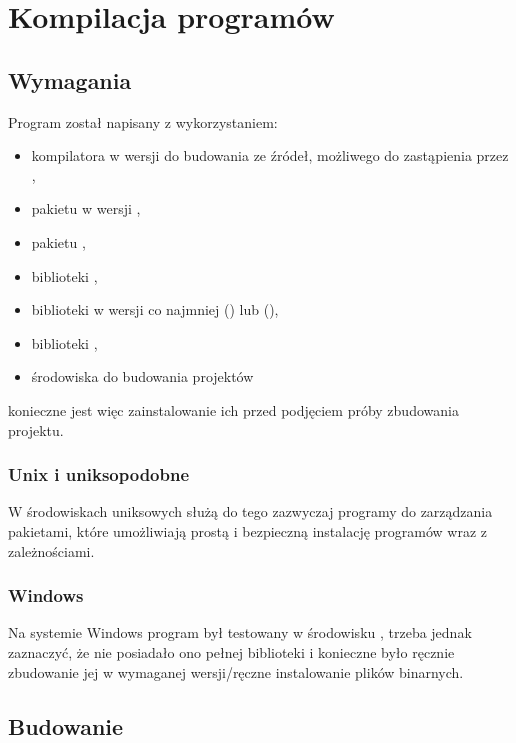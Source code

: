 \documentclass[polish]{standalone}
\begin{document}
\appendix

\chapter{Kompilacja programów}

\section{Wymagania}

Program został napisany z wykorzystaniem:
\begin{itemize}
\item kompilatora  w wersji  do budowania ze źródeł, możliwego do zastąpienia przez  
,
\item pakietu  w wersji ,
\item pakietu ,
\item biblioteki ,
\item biblioteki  w wersji co najmniej  () lub  (),
\item biblioteki ,
\item środowiska do budowania projektów 
\end{itemize}
konieczne jest więc zainstalowanie ich przed podjęciem próby zbudowania projektu.

\subsection{Unix i uniksopodobne}

W środowiskach uniksowych służą do tego zazwyczaj programy do zarządzania pakietami, które umożliwiają prostą
i bezpieczną instalację programów wraz z zależnościami.

\subsection{Windows}

Na systemie Windows program był testowany w środowisku , trzeba jednak zaznaczyć, że nie posiadało ono
pełnej biblioteki  i konieczne było ręcznie zbudowanie jej w wymaganej wersji/ręczne instalowanie plików
binarnych.

\section{Budowanie}
\end{document}

